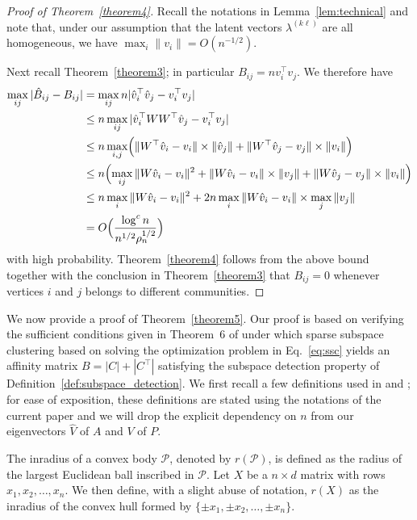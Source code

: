 \documentclass[12pt]{article}
\begin{document}
\begin{proof}[Proof of Theorem~\ref{theorem4}]
Recall the notations in Lemma~\ref{lem:technical} and note that,
under our assumption that the latent vectors $\lambda^{(k \ell)}$
are all homogeneous, we have $\max_{i} \|v_i\| =
O(n^{-1/2})$. 

Next recall Theorem~\ref{theorem3}; in particular $B_{ij} = nv_i^{\top}
v_j$. 
We therefore have
\[\begin{split}
 \max_{ij} |\hat{B}_{ij} - B_{ij}| &= \max_{ij} n |\hat{v}_i^\top \hat{v}_j -
v_i^\top v_j| \\
& \leq n \max_{ij} |\hat{v}_i^\top W W^\top \hat{v}_j -
v_i^\top v_j| \\
& \leq n \max_{i,j} \Bigl(\|W^{\top} \hat{v}_i - v_i\| \times \|\hat{v}_j\|
+ \|W^{\top} \hat{v}_j - v_j\| \times \|v_i\|\Bigr) \\
& \leq n \Bigl(\max_{ij}  \|W \hat{v}_i  - v_i \|^2 +  \|W
\hat{v}_i  - v_i \| \times \|v_j\| +  \|W \hat{v}_j  - v_j \| \times \|v_i\|\Bigr) 
\\ &
\leq n \max_{i} \|W \hat{v}_i  - v_i \|^2 + 2n \max_{i}
\|W \hat{v}_i  - v_i \| \times \max_{j} \|v_j\|
\\
& = O \Big( \frac{\log^{c}{n}}{n^{1/2} \rho_n^{1/2}} \Big)
\end{split}\]
with high probability.
Theorem~\ref{theorem4} follows from the above bound together with the
conclusion in Theorem~\ref{theorem3} that $B_{ij} = 0$ whenever vertices $i$ and $j$
belongs to different communities. 
\end{proof}

We now provide a proof of Theorem~\ref{theorem5}. Our proof is based
on verifying the sufficient conditions given in Theorem~6 of
\citet{jmlr-v28-wang13}
under which sparse subspace clustering based on solving the
optimization problem in Eq.~\eqref{eq:ssc} yields an affinity matrix
$B = |C| + |C^{\top}|$ satisfying the subspace detection property of
Definition~\ref{def:subspace_detection}. We first recall a few
definitions used in \citet{soltanolkotabi2012} and \citet{jmlr-v28-wang13}; for ease of exposition,
these definitions are stated using the notations of the current
paper and we will drop the explicit dependency on $n$ from our
eigenvectors $\hat{V}$ of $A$ and $V$ of $P$.
\begin{definition}[Inradius]
  \label{inradius}
The inradius of a convex body $\mathcal{P}$, denoted by $r(\mathcal{P})$, is
defined as the radius of the largest Euclidean ball inscribed in $\mathcal{P}$.
Let $X$ be a $n \times d$ matrix with rows $x_1, x_2, \dots,
x_n$. We then define, with a slight abuse of notation, $r(X)$ as the
inradius of the convex hull formed by $\{\pm x_1, \pm x_2, \dots, \pm x_n\}$. 
\end{definition}
\end{document}
